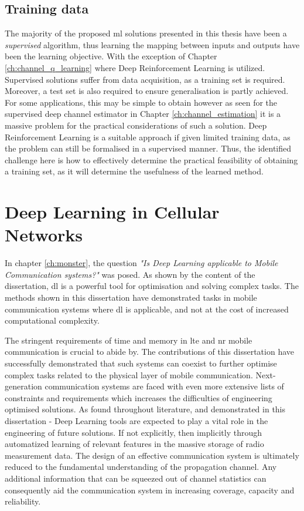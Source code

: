 \subsection{Training data}
The majority of the proposed \gls{ml} solutions presented in this thesis have been a \emph{supervised} algorithm, thus learning the mapping between inputs and outputs have been the learning objective. With the exception of Chapter \ref{ch:channel_q_learning} where Deep Reinforcement Learning is utilized. Supervised solutions suffer from data acquisition, as a training set is required. Moreover, a test set is also required to ensure generalisation is partly achieved. For some applications, this may be simple to obtain however as seen for the supervised deep channel estimator in Chapter \ref{ch:channel_estimation} it is a massive problem for the practical considerations of such a solution. Deep Reinforcement Learning is a suitable approach if given limited training data, as the problem can still be formalised in a supervised manner. Thus, the identified challenge here is how to effectively determine the practical feasibility of obtaining a training set, as it will determine the usefulness of the learned method. 

\section{Deep Learning in Cellular Networks}

In chapter \ref{ch:monster}, the question \emph{"Is Deep Learning applicable to Mobile Communication systems?"} was posed. As shown by the content of the dissertation, \acrlong{dl} is a powerful tool for optimisation and solving complex tasks. The methods shown in this dissertation have demonstrated tasks in mobile communication systems where \gls{dl} is applicable, and not at the cost of increased computational complexity. 


The stringent requirements of time and memory in \gls{lte} and \gls{nr} mobile communication is crucial to abide by. The contributions of this dissertation have successfully demonstrated that such systems can coexist to further optimise complex tasks related to the physical layer of mobile communication. Next-generation communication systems are faced with even more extensive lists of constraints and requirements which increases the difficulties of engineering optimised solutions. As found throughout literature, and demonstrated in this dissertation - Deep Learning tools are expected to play a vital role in the engineering of future solutions. If not explicitly, then implicitly through automatized learning of relevant features in the massive storage of radio measurement data. The design of an effective communication system is ultimately reduced to the fundamental understanding of the propagation channel. Any additional information that can be squeezed out of channel statistics can consequently aid the communication system in increasing coverage, capacity and reliability.

